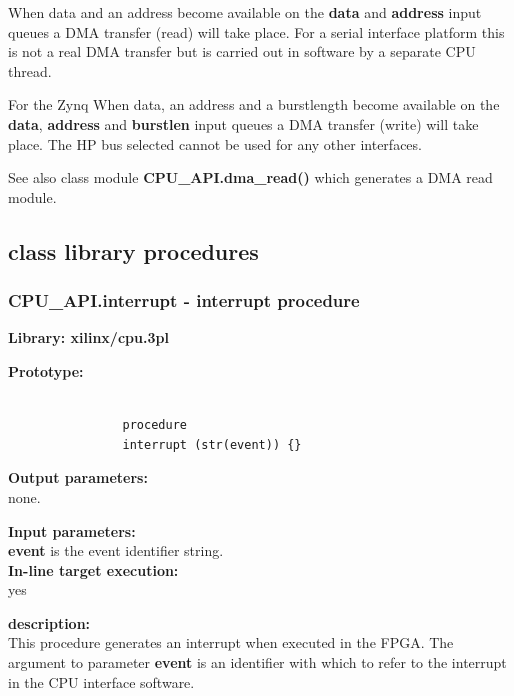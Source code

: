             When data and an address become available on the {\bf data} and {\bf
            address} input queues a DMA transfer (read) will take place. For a
            serial interface platform this is not a real DMA transfer but is
            carried out in software by a separate CPU thread.

            For the Zynq When data, an address and a burstlength become available
            on the {\bf data}, {\bf address} and {\bf burstlen} input queues a
            DMA transfer (write) will take place. The HP bus selected cannot be
            used for any other interfaces.

            See also class module {\bf CPU\_API.dma\_read()}
             which generates a DMA read module.



    
    \subsection{class library procedures}
            
                
        \subsubsection{CPU\_API.interrupt - interrupt procedure}\label{sec:lpcpuint}

            {\bf Library: xilinx/cpu.3pl}

            {\bf Prototype:} \\
            \vsp
            \begin{lstlisting}[gobble=12, language=threepl]

                procedure
                interrupt (str(event)) {}
            \end{lstlisting}

            {\bf Output parameters:} \\
            
            none.

            {\bf Input parameters:} \\
            {\bf event} is the event identifier string.\\
        
            {\bf In-line target execution:} \\
            yes

            {\bf description:} \\
            This procedure generates an interrupt when executed in the FPGA.
            The argument to parameter {\bf event} is an identifier with
            which to refer to the interrupt in the CPU interface software.

